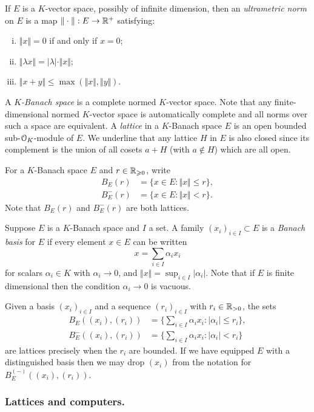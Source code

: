 \documentclass{lms}
\begin{document}
If $E$ is a $K$-vector space, possibly of infinite dimension, then an
\emph{ultrametric norm} on $E$ is a map $\Vert\cdot\Vert : E \to \mathbb R^+$ satisfying:
\begin{enumerate}[(i)]
\item $\Vert x\Vert = 0$ if and only if $x = 0$;
\item $\Vert \lambda x\Vert = |\lambda| \cdot \Vert x\Vert$;
\item $\Vert x+y\Vert \leq \max(\Vert x\Vert, \Vert y\Vert)$.
\end{enumerate}
A \emph{$K$-Banach space} is a complete normed $K$-vector space.  Note that any finite-dimensional
normed $K$-vector space is automatically complete and all norms over such a space are equivalent.
A \emph{lattice} in a $K$-Banach space $E$ is an open bounded sub-$\OK$-module of $E$.
We underline that any lattice $H$ in $E$ is also closed since its 
complement is the union of all cosets $a + H$ (with $a \not\in H$) which 
are all open.

For a $K$-Banach space $E$ and $r \in \mathbb R_{\geqslant 0}$, write
\begin{align*}
B_E(r) &= \{ x \in E : \Vert x \Vert \le r \}, \\
B^-_E(r) &= \{ x \in E : \Vert x \Vert < r\}.
\end{align*}
Note that $B_E(r)$ and $B^-_E(r)$ are both lattices.

Suppose $E$ is a $K$-Banach space and $I$ a set.
A family $(x_i)_{i \in I} \subset E$ is a \emph{Banach basis} for $E$ if
every element $x \in E$ can be written
\[
x = \sum_{i \in I} \alpha_i x_i
\]
for scalars $\alpha_i \in K$ with $\alpha_i \to 0$, and $\Vert x \Vert = \sup_{i \in I} \lvert \alpha_i \rvert$.
Note that if $E$ is finite dimensional then the condition $\alpha_i \to 0$ is vacuous.

Given a basis $(x_i)_{i \in I}$ and a sequence $(r_i)_{i \in I}$ with $r_i \in \mathbb R_{>0}$, the sets
\begin{align*}
B_E((x_i),(r_i)) &= \Big\{ \sum_{i \in I} \alpha_i x_i : \lvert \alpha_i \rvert \le r_i \Big\}, \\
B^-_E((x_i),(r_i)) &= \Big\{ \sum_{i \in I} \alpha_i x_i : \lvert \alpha_i \rvert < r_i \Big\}
\end{align*}
are lattices precisely when the $r_i$ are bounded.  If we have equipped $E$ with a distinguished basis
then we may drop $(x_i)$ from the notation for $B^{(-)}_E((x_i),(r_i))$.

\subsubsection*{Lattices and computers.}
\end{document}
